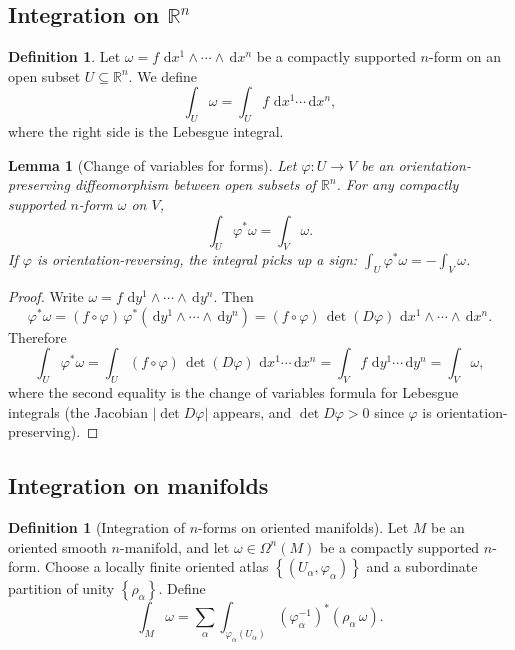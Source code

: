 \documentclass[12pt,a4paper,openany]{book}
\newtheorem{lemma}[theorem]{Lemma}
\theoremstyle{definition}
\newtheorem{definition}[theorem]{Definition}
\theoremstyle{remark}
\newcommand{\R}{\mathbb{R}}
\newcommand{\dd}{\,\mathrm{d}}
\newcommand{\abs}[1]{\left\lvert #1 \right\rvert}
\newcommand{\set}[1]{\left\{ #1 \right\}}
\begin{document}
\subsection{Integration on $\R^n$}

\begin{definition}\label{def:integration-Rn}
\index{integration!on $\R^n$}
Let $\omega = f\,\dd x^1 \wedge \cdots \wedge \dd x^n$ be a compactly
supported $n$-form on an open subset $U \subseteq \R^n$. We define
\[
  \int_U \omega = \int_U f\,\dd x^1 \cdots \dd x^n,
\]
where the right side is the Lebesgue integral.
\end{definition}

\begin{lemma}[Change of variables for forms]\label{lem:change-variables-forms}
Let $\varphi \colon U \to V$ be an orientation-preserving diffeomorphism
between open subsets of $\R^n$. For any compactly supported $n$-form
$\omega$ on $V$,
\[
  \int_U \varphi^*\omega = \int_V \omega.
\]
If $\varphi$ is orientation-reversing, the integral picks up a sign:
$\int_U \varphi^*\omega = -\int_V \omega$.
\end{lemma}

\begin{proof}
Write $\omega = f\,\dd y^1 \wedge \cdots \wedge \dd y^n$. Then
\[
  \varphi^*\omega = (f \circ \varphi)\,
    \varphi^*(\dd y^1 \wedge \cdots \wedge \dd y^n)
  = (f \circ \varphi)\, \det(D\varphi)\, \dd x^1 \wedge \cdots \wedge \dd x^n.
\]
Therefore
\[
  \int_U \varphi^*\omega = \int_U (f \circ \varphi)\, \det(D\varphi)\,
    \dd x^1 \cdots \dd x^n = \int_V f\, \dd y^1 \cdots \dd y^n = \int_V \omega,
\]
where the second equality is the change of variables formula for Lebesgue
integrals (the Jacobian $\abs{\det D\varphi}$ appears, and
$\det D\varphi > 0$ since $\varphi$ is orientation-preserving).
\end{proof}

\subsection{Integration on manifolds}

\begin{definition}[Integration of $n$-forms on oriented manifolds]
\label{def:integration-manifold}
Let $M$ be an oriented smooth $n$-manifold, and let $\omega \in \Omega^n(M)$
be a compactly supported $n$-form. Choose a locally finite oriented atlas
$\set{(U_\alpha, \varphi_\alpha)}$ and a subordinate partition of
unity $\set{\rho_\alpha}$. Define
\[
  \int_M \omega = \sum_\alpha \int_{\varphi_\alpha(U_\alpha)}
    (\varphi_\alpha^{-1})^*(\rho_\alpha\, \omega).
\]
\end{definition}
\end{document}
